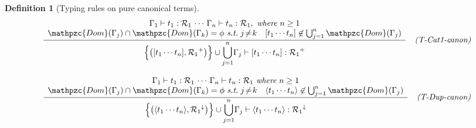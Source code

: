 \documentclass[12pt]{article}
\newtheorem{Definition}{Definition}[section]
\begin{document}
\begin{Definition}[Typing rules on pure canonical terms]
\begin{displaymath}
\begin{array}{c}
      \begin{array}{rl}
        \dfrac{
          \begin{array}{c}
            \Gamma_1 \vdash t_1 : \mathcal{R}_1 \,\cdots\,
             \Gamma_n \vdash t_n : \mathcal{R}_1,\
              \text{\it where}\ n \ge 1 \\
            \mathpzc{Dom}(\Gamma_j) \cap \mathpzc{Dom}(\Gamma_k) = \phi
             \ \text{\it s.t.}\; j \!\neq\! k
            \quad [t_1 \cdots t_n ] \not\in \bigcup_{j=1}^{n}
             \mathpzc{Dom}(\Gamma_j)
          \end{array}
        }{
          \Bigl\{\bigl([t_1 \cdots t_n], {\mathcal{R}_1}^+ \bigr) \Bigr\}
           \cup {\displaystyle \bigcup_{j = 1}^{n}} \Gamma_j
            \vdash [t_1 \cdots t_n] : {\mathcal{R}_1}^+
        }  &  \text{\it (T-Cat1-canon)}
      \end{array}  \\
      \\
      
      \begin{array}{rl}
        \dfrac{
          \begin{array}{c}
            \Gamma_1 \vdash t_1 : \mathcal{R}_1 \,\cdots\,
             \Gamma_n \vdash t_n : \mathcal{R}_1\
              \text{\it where}\ n \ge 1 \\
            \mathpzc{Dom}(\Gamma_j) \cap \mathpzc{Dom}(\Gamma_k) = \phi
             \ \text{\it s.t.}\; j \!\neq\! k
            \quad \langle t_1 \cdots t_n \rangle \not\in \bigcup_{j=1}^{n}
             \mathpzc{Dom}(\Gamma_j)
          \end{array}
        }{
          \Bigl\{\bigl(\langle t_1 \cdots t_n \rangle,
          {\mathcal{R}_1}^\downarrow \bigr) \Bigr\}
          \cup {\displaystyle \bigcup_{j = 1}^{n}} \Gamma_j \vdash
          \langle t_1 \cdots t_n \rangle : {\mathcal{R}_1}^\downarrow
        }  &  \text{\it (T-Dup-canon)}
      \end{array}  \\
      
    \end{array}
  \end{displaymath}
  
  \begin{displaymath}
    \begin{array}{c}
      

\end{array}
\end{displaymath}
\end{Definition}
\end{document}
